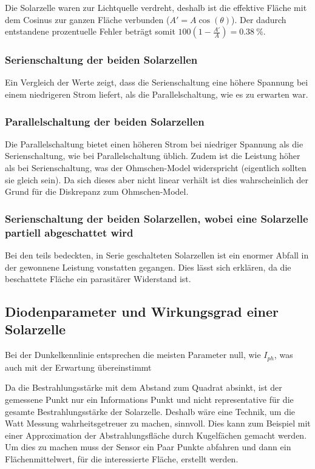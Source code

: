\documentclass[12pt,english,ngerman]{scrartcl}
\begin{document}
Die Solarzelle waren zur Lichtquelle verdreht, deshalb ist die effektive Fläche
mit dem Cosinus zur ganzen Fläche verbunden ($A' = A \cos(\theta)$). Der
dadurch entstandene prozentuelle Fehler beträgt somit
$100(1-\frac{A'}{A})=\SI{0.38}{\percent}$.

\subsubsection{Serienschaltung der beiden Solarzellen}

Ein Vergleich der Werte zeigt, dass die Serienschaltung eine höhere Spannung
bei einem niedrigeren Strom liefert, als die Parallelschaltung, wie es zu
erwarten war.

\subsubsection{Parallelschaltung der beiden Solarzellen}

Die Parallelschaltung bietet einen höheren Strom bei niedriger Spannung als die
Serienschaltung, wie bei Parallelschaltung üblich. Zudem ist die Leistung höher
als bei Serienschaltung, was der Ohmschen-Model widerspricht (eigentlich
sollten sie gleich sein). Da sich dieses aber nicht linear verhält ist dies
wahrscheinlich der Grund für die Diskrepanz zum Ohmschen-Model.

\subsubsection{Serienschaltung der beiden Solarzellen, wobei eine Solarzelle partiell abgeschattet wird}

Bei den teils bedeckten, in Serie geschalteten Solarzellen ist ein enormer
Abfall in der gewonnene Leistung vonstatten gegangen. Dies lässt sich erklären,
da die beschattete Fläche ein parasitärer Widerstand ist.

\subsection{Diodenparameter und Wirkungsgrad einer Solarzelle}

Bei der Dunkelkennlinie entsprechen die meisten Parameter null, wie $I_{ph}$,
was auch mit der Erwartung übereinstimmt

Da die Bestrahlungsstärke mit dem Abstand zum Quadrat absinkt, ist der
gemessene Punkt nur ein Informations Punkt und nicht representative für die
gesamte Bestrahlungsstärke der Solarzelle. Deshalb wäre eine Technik, um die
Watt Messung wahrheitsgetreuer zu machen, sinnvoll. Dies kann zum Beispiel mit
einer Approximation der Abstrahlungsfläche durch Kugelfächen gemacht werden. Um
dies zu machen muss der Sensor ein Paar Punkte abfahren und dann ein
Flächenmittelwert, für die interessierte Fläche, erstellt werden.
\end{document}
